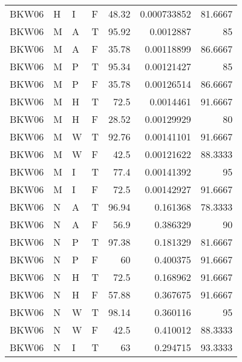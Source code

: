 \begin{longtable}{llllrrr}
    BKW06    & H         & I         & F          & 48.32      & 0.000733852 & 81.6667  \\
    BKW06    & M         & A         & T          & 95.92      & 0.0012887   & 85       \\
    BKW06    & M         & A         & F          & 35.78      & 0.00118899  & 86.6667  \\
    BKW06    & M         & P         & T          & 95.34      & 0.00121427  & 85       \\
    BKW06    & M         & P         & F          & 35.78      & 0.00126514  & 86.6667  \\
    BKW06    & M         & H         & T          & 72.5       & 0.0014461   & 91.6667  \\
    BKW06    & M         & H         & F          & 28.52      & 0.00129929  & 80       \\
    BKW06    & M         & W         & T          & 92.76      & 0.00141101  & 91.6667  \\
    BKW06    & M         & W         & F          & 42.5       & 0.00121622  & 88.3333  \\
    BKW06    & M         & I         & T          & 77.4       & 0.00141392  & 95       \\
    BKW06    & M         & I         & F          & 72.5       & 0.00142927  & 91.6667  \\
    BKW06    & N         & A         & T          & 96.94      & 0.161368    & 78.3333  \\
    BKW06    & N         & A         & F          & 56.9       & 0.386329    & 90       \\
    BKW06    & N         & P         & T          & 97.38      & 0.181329    & 81.6667  \\
    BKW06    & N         & P         & F          & 60         & 0.400375    & 91.6667  \\
    BKW06    & N         & H         & T          & 72.5       & 0.168962    & 91.6667  \\
    BKW06    & N         & H         & F          & 57.88      & 0.367675    & 91.6667  \\
    BKW06    & N         & W         & T          & 98.14      & 0.360116    & 95       \\
    BKW06    & N         & W         & F          & 42.5       & 0.410012    & 88.3333  \\
    BKW06    & N         & I         & T          & 63         & 0.294715    & 93.3333  \\

\end{longtable}
